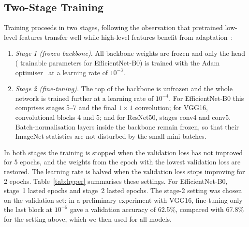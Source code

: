 \documentclass[conference]{IEEEtran}
\begin{document}
\begin{table}[!htb]
\centering
\caption{Architecture of the proposed model}
\label{tab:arch}
\end{table}

\subsection{Two-Stage Training}
Training proceeds in two stages, following the observation that pretrained
low-level features transfer well while high-level features benefit from
adaptation~\cite{yosinski2014}:
\begin{enumerate}
\item \emph{Stage 1 (frozen backbone).} All backbone weights are frozen and only
the head (\MainFrozenTrainable{} trainable parameters for EfficientNet-B0) is
trained with the Adam optimiser~\cite{kingma2015} at a learning rate of $10^{-3}$.
\item \emph{Stage 2 (fine-tuning).} The top of the backbone is unfrozen and the
whole network is trained further at a learning rate of $10^{-4}$. For
EfficientNet-B0 this comprises stages 5--7 and the final $1\times1$ convolution;
for VGG16, convolutional blocks 4 and 5; and for ResNet50, stages conv4 and conv5.
Batch-normalisation layers inside the backbone remain frozen, so that their
ImageNet statistics are not disturbed by the small mini-batches.
\end{enumerate}
In both stages the training is stopped when the validation loss has not improved
for 5 epochs, and the weights from the epoch with the lowest validation loss are
restored. The learning rate is halved when the validation loss stops improving
for 2 epochs. Table~\ref{tab:hyper} summarises these settings. For
EfficientNet-B0, stage~1 lasted \EpochsStageOne{} epochs and
stage~2 lasted \EpochsStageTwo{} epochs. The stage-2 setting was chosen on the
validation set: in a preliminary experiment with VGG16, fine-tuning only the last
block at $10^{-5}$ gave a validation accuracy of 62.5\%, compared with 67.8\% for
the setting above, which we then used for all models.
\end{document}
